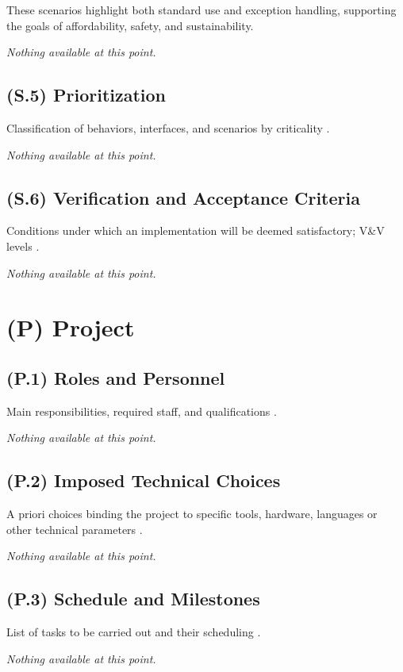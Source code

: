 \documentclass[12pt,letterpaper]{article}
\begin{document}
These scenarios highlight both standard use and exception handling, supporting the goals of affordability, safety, and sustainability.

\textit{Nothing available at this point.}

\subsection{(S.5) Prioritization}
Classification of behaviors, interfaces, and scenarios by criticality \cite{meyer2022}.

\textit{Nothing available at this point.}

\subsection{(S.6) Verification and Acceptance Criteria}
Conditions under which an implementation will be deemed satisfactory; V\&V levels \cite{meyer2022}.

\textit{Nothing available at this point.}

\clearpage

\section{(P) Project}

\subsection{(P.1) Roles and Personnel}
Main responsibilities, required staff, and qualifications \cite{meyer2022}.

\textit{Nothing available at this point.}

\subsection{(P.2) Imposed Technical Choices}
A priori choices binding the project to specific tools, hardware, languages or other technical parameters \cite{meyer2022}.

\textit{Nothing available at this point.}

\subsection{(P.3) Schedule and Milestones}
List of tasks to be carried out and their scheduling \cite{meyer2022}.

\textit{Nothing available at this point.}
\end{document}
